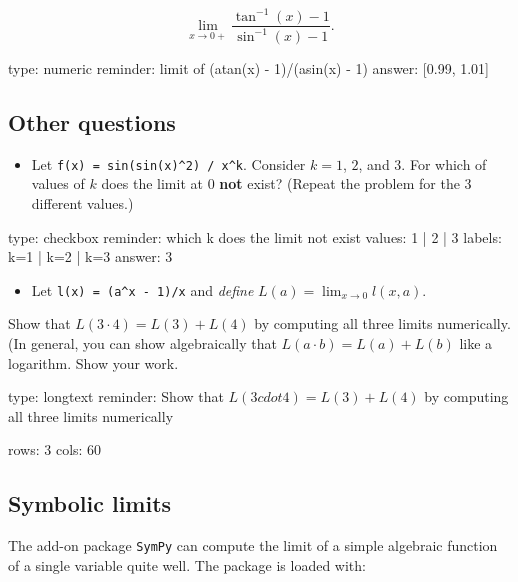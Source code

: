 \documentclass[12pt]{article}
\begin{document}
\[
\lim_{x \rightarrow 0+} \frac{\tan^{-1}(x) - 1}{\sin^{-1}(x) - 1}.
\]

\begin{answer}
    type: numeric
    reminder: limit of   (atan(x) - 1)/(asin(x) - 1)
    answer: [0.99, 1.01]

\end{answer}

\subsection{Other questions}

\begin{itemize}
\itemsep1pt\parskip0pt
\item
  Let \texttt{f(x) = sin(sin(x)\^{}2) / x\^{}k}. Consider $k=1$, $2$,
  and $3$. For which of values of $k$ does the limit at $0$ \textbf{not}
  exist? (Repeat the problem for the 3 different values.)
\end{itemize}

\begin{answer}
type: checkbox
reminder: which k does the limit not exist
values: 1 | 2 | 3
labels: k=1 | k=2 | k=3
answer: 3
\end{answer}

\begin{itemize}
\itemsep1pt\parskip0pt
\item
  Let \texttt{l(x) = (a\^{}x - 1)/x} and \emph{define}
  $L(a) = \lim_{x\rightarrow 0} l(x,a)$.
\end{itemize}

Show that $L(3 \cdot 4) = L(3) + L(4)$ by computing all three limits
numerically. (In general, you can show algebraically that
$L(a\cdot b) = L(a) + L(b)$ like a logarithm. Show your work.

\begin{answer}
type: longtext
reminder: Show that \( L(3 cdot 4) = L(3) + L(4) \) by computing all three limits numerically

rows: 3
cols: 60
\end{answer}

\subsection{Symbolic limits}

The add-on package \texttt{SymPy} can compute the limit of a simple
algebraic function of a single variable quite well. The package is
loaded with:
\end{document}
